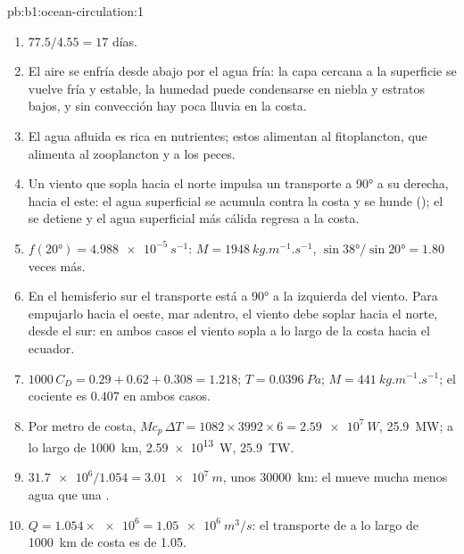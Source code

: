 \begin{solution}{pb:b1:ocean-circulation:1}
\begin{enumerate}
  \item $77.5/4.55 = 17$ días.
  \item El aire se enfría desde abajo por el agua fría: la capa cercana a la superficie se vuelve fría y estable, la humedad puede condensarse en niebla y estratos bajos, y sin convección hay poca lluvia en la costa.
  \item El agua afluida es rica en nutrientes; estos alimentan al fitoplancton, que alimenta al zooplancton y a los peces.
  \item Un viento que sopla hacia el norte impulsa un transporte a \ang{90} a su derecha, hacia el este: el agua superficial se acumula contra la costa y se hunde (); el  se detiene y el agua superficial más cálida regresa a la costa.
  \item $f(\ang{20}) = \qty{4.988e-5}{s^{-1}}$: $M = \qty{1948}{kg.m^{-1}.s^{-1}}$,
        $\sin\ang{38}/\sin\ang{20} = 1.80$ veces más.
  \item En el hemisferio sur el transporte está a \ang{90} a la izquierda del viento. Para empujarlo hacia el oeste, mar adentro, el viento debe soplar hacia el norte, desde el sur: en ambos casos el viento sopla a lo largo de la costa hacia el ecuador.
  \item $1000\,C_D = 0.29 + 0.62 + 0.308 = 1.218$; $T = \qty{0.0396}{Pa}$; $M =
        \qty{441}{kg.m^{-1}.s^{-1}}$; el cociente es $0.407$ en ambos casos.
  \item Por metro de costa, $M c_p\,\Delta T = 1082 \times 3992 \times 6 =
        \qty{2.59e7}{W}$, \qty{25.9}{MW}; a lo largo de \qty{1000}{km}, \qty{2.59e13}{W},
        \qty{25.9}{TW}.
  \item $\num{31.7e6}/1.054 = \qty{3.01e7}{m}$, unos \qty{30000}{km}: el  mueve mucha menos agua que una .
  \item $Q = 1.054 \times \num{e6} = \qty{1.05e6}{m^3/s}$: el transporte de  a lo largo de \qty{1000}{km} de costa es de \qty{1.05}{\sverdrup}.
\end{enumerate}
\end{solution}

